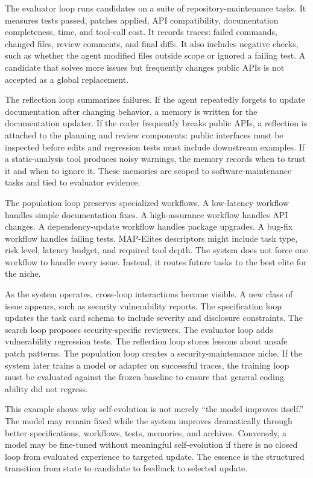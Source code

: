 The evaluator loop runs candidates on a suite of repository-maintenance tasks.  It measures tests passed, patches applied, API compatibility, documentation completeness, time, and tool-call cost.  It records traces: failed commands, changed files, review comments, and final diffs.  It also includes negative checks, such as whether the agent modified files outside scope or ignored a failing test.  A candidate that solves more issues but frequently changes public APIs is not accepted as a global replacement.

The reflection loop summarizes failures.  If the agent repeatedly forgets to update documentation after changing behavior, a memory is written for the documentation updater.  If the coder frequently breaks public APIs, a reflection is attached to the planning and review components: public interfaces must be inspected before edits and regression tests must include downstream examples.  If a static-analysis tool produces noisy warnings, the memory records when to trust it and when to ignore it.  These memories are scoped to software-maintenance tasks and tied to evaluator evidence.

The population loop preserves specialized workflows.  A low-latency workflow handles simple documentation fixes.  A high-assurance workflow handles API changes.  A dependency-update workflow handles package upgrades.  A bug-fix workflow handles failing tests.  MAP-Elites descriptors might include task type, risk level, latency budget, and required tool depth.  The system does not force one workflow to handle every issue.  Instead, it routes future tasks to the best elite for the niche.

As the system operates, cross-loop interactions become visible.  A new class of issue appears, such as security vulnerability reports.  The specification loop updates the task card schema to include severity and disclosure constraints.  The search loop proposes security-specific reviewers.  The evaluator loop adds vulnerability regression tests.  The reflection loop stores lessons about unsafe patch patterns.  The population loop creates a security-maintenance niche.  If the system later trains a model or adapter on successful traces, the training loop must be evaluated against the frozen baseline to ensure that general coding ability did not regress.

This example shows why self-evolution is not merely ``the model improves itself.''  The model may remain fixed while the system improves dramatically through better specifications, workflows, tests, memories, and archives.  Conversely, a model may be fine-tuned without meaningful self-evolution if there is no closed loop from evaluated experience to targeted update.  The essence is the structured transition from state to candidate to feedback to selected update.

